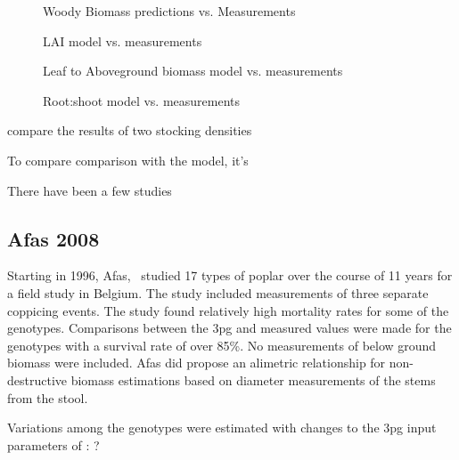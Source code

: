 \documentclass[10pt]{article}
\begin{document}
\begin{figure}
  \centering
  
  \caption{Woody Biomass predictions vs. Measurements}
  \label{fig:proe-wood}
\end{figure}

\begin{figure}[!ht]
  \centering
    
  \caption{\ac{LAI} model vs. measurements}
  \label{fig:proe-light}
\end{figure}

\begin{figure}[!ht]
  \centering
    
  \caption{Leaf to Aboveground biomass model vs. measurements}
  \label{fig:proe-leaf}
\end{figure}

\begin{figure}[!ht]
  \centering
    
  \caption{Root:shoot model vs. measurements}
  \label{fig:proe-rootshoot}
\end{figure}

\cite{Proe2002} compare the results of two stocking densities

To compare comparison with the
model, it's 

There have been a few studies

\subsection*{Afas 2008}
\label{afas2008}

Starting in 1996, Afas,~\cite{Afas2008a} studied 17 types of poplar
over the course of 11 years for a field study in Belgium.  The study
included measurements of three separate coppicing events.  The study
found relatively high mortality rates for some of the genotypes.
Comparisons between the \ac{3pg} and measured values were made for the
genotypes with a survival rate of over 85\%.  No measurements of below
ground biomass were included.  Afas did propose an alimetric
relationship for non-destructive biomass estimations based on diameter
measurements of the stems from the stool.

Variations among the genotypes were estimated with changes to the \ac{3pg}
input parameters of : ?

\begin{table}[!ht]
  \centering
    
  \caption{\ac{3pg} parameter variations of \ac{3pg} among genotypes}
  \label{tab:afas-3pg}
\end{table}
\end{document}
